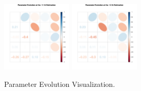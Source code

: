 \begin{figure}[h]
\includegraphics[width=0.3\textwidth,height=0.18\textheight]{Chapters/05MCMCOU/plots/paraEvolution/corMatrix11.pdf}
\includegraphics[width=0.3\textwidth,height=0.18\textheight]{Chapters/05MCMCOU/plots/paraEvolution/corMatrix12.pdf}
\caption{Parameter Evolution Visualization. }
\end{figure}

